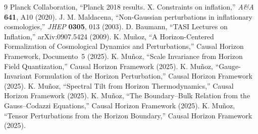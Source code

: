 \documentclass[12pt,a4paper]{article}
\begin{document}
\begin{thebibliography}{9}
 Planck Collaboration, ``Planck 2018 results. X. Constraints on inflation,'' \textit{A\&A} \textbf{641}, A10 (2020).
 J. M. Maldacena, ``Non-Gaussian perturbations in inflationary cosmologies,'' \textit{JHEP} \textbf{0305}, 013 (2003).
 D. Baumann, ``TASI Lectures on Inflation,'' arXiv:0907.5424 (2009).
 K. Mu\~noz, ``A Horizon-Centered Formalization of Cosmological Dynamics and Perturbations,'' Causal Horizon Framework, Documento~5 (2025).
 K. Mu\~noz, ``Scale Invariance from Horizon Field Quantization,'' Causal Horizon Framework (2025).
 K. Mu\~noz, ``Gauge-Invariant Formulation of the Horizon Perturbation,'' Causal Horizon Framework (2025).
 K. Mu\~noz, ``Spectral Tilt from Horizon Thermodynamics,'' Causal Horizon Framework (2025).
 K. Mu\~noz, ``The Boundary--Bulk Relation from the Gauss--Codazzi Equations,'' Causal Horizon Framework (2025).
 K. Mu\~noz, ``Tensor Perturbations from the Horizon Boundary,'' Causal Horizon Framework (2025).
\end{thebibliography}
\end{document}

